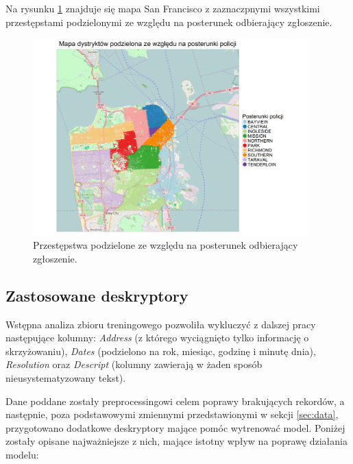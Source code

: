 \documentclass[11pt]{article} %
\begin{document}
Na rysunku \ref{fig:sf_districts} znajduje się mapa San Francisco z zaznaczpnymi wszystkimi przestępstami podzielonymi ze względu na posterunek odbierający zgłoszenie.

\begin{figure}[!h]
  \centering
    \includegraphics[width=0.95\textwidth]{images/sf_districts}
  \caption{Przestępstwa podzielone ze względu na posterunek odbierający zgłoszenie.} \label{fig:sf_districts}
\end{figure}


\subsection{Zastosowane deskryptory}

Wstępna analiza zbioru treningowego pozwoliła wykluczyć z dalszej pracy następujące kolumny: \textit{Address} (z którego wyciągnięto tylko informację o skrzyżowaniu), \textit{Dates} (podzielono na rok, miesiąc, godzinę i minutę dnia), \textit{Resolution} oraz \textit{Descript} (kolumny zawierają w żaden sposób nieusystematyzowany tekst).

Dane poddane zostały preprocessingowi celem poprawy brakujących rekordów, a następnie, poza podstawowymi zmiennymi przedstawionymi w sekcji \ref{sec:data}, przygotowano dodatkowe deskryptory mające pomóc wytrenować model. Poniżej zostały opisane najważniejsze z nich, mające istotny wpływ na poprawę działania modelu:
\end{document}
